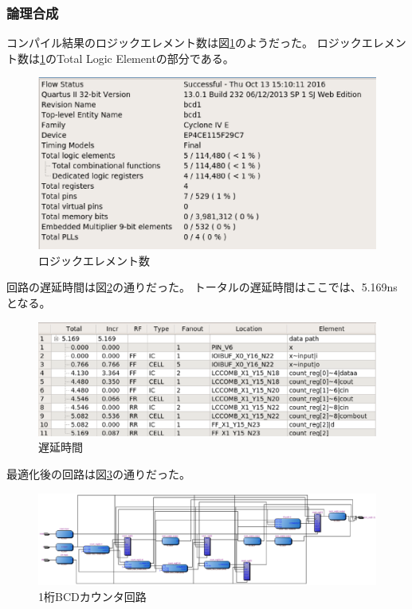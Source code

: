 \documentclass[uplatex]{jsarticle}
\begin{document}
\subsubsection{論理合成}


コンパイル結果のロジックエレメント数は図\ref{fig:16}のようだった。
ロジックエレメント数は\ref{fig:16}のTotal Logic Elementの部分である。  

\begin{figure}[htb]
  \begin{center}
    \includegraphics[width=13cm]{images/fig16.eps}
    \caption{ロジックエレメント数}
    \label{fig:16}
  \end{center}
\end{figure}

回路の遅延時間は図\ref{fig:17}の通りだった。
トータルの遅延時間はここでは、5.169nsとなる。

\begin{figure}[htb]
  \begin{center}
    \includegraphics[width=13cm]{images/fig17.eps}
    \caption{遅延時間}
    \label{fig:17}
  \end{center}
\end{figure}

最適化後の回路は図\ref{fig:18}の通りだった。

\begin{figure}[htb]
  \begin{center}
    \includegraphics[width=13cm]{images/fig18.eps}
    \caption{1桁BCDカウンタ回路}
    \label{fig:18}
  \end{center}
\end{figure}
\end{document}

